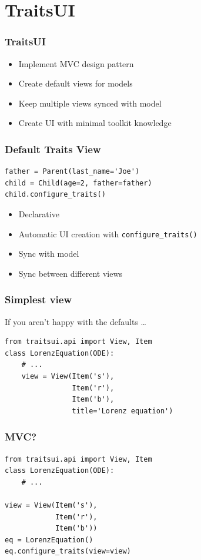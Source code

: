 \documentclass[14pt,compress]{beamer}
\newcommand{\typ}[1]{\lstinline{#1}}
\begin{document}
\section{TraitsUI}

\begin{frame}
  \frametitle{TraitsUI}
  \begin{itemize}
      \item Implement MVC design pattern
      \item Create default views for models
      \item Keep multiple views synced with model
      \item Create UI with minimal toolkit knowledge
  \end{itemize}
\end{frame}

\begin{frame}
\frametitle{Default Traits View}
\begin{lstlisting}
father = Parent(last_name='Joe')
child = Child(age=2, father=father)
child.configure_traits()
\end{lstlisting}
\pause
\begin{itemize}
    \item Declarative
\item Automatic UI creation with \typ{configure_traits()}
\item Sync with model
\item Sync between different views
\end{itemize}
\end{frame}

\begin{frame}
\frametitle{Simplest view}
If you aren't happy with the defaults \dots
\small
\begin{lstlisting}
from traitsui.api import View, Item
class LorenzEquation(ODE):
    # ...
    view = View(Item('s'),
                Item('r'),
                Item('b'), 
                title='Lorenz equation')
\end{lstlisting}
\end{frame}

\begin{frame}
\frametitle{MVC?}
\small
\begin{lstlisting}
from traitsui.api import View, Item
class LorenzEquation(ODE):
    # ...

view = View(Item('s'),
            Item('r'),
            Item('b'))
eq = LorenzEquation()
eq.configure_traits(view=view)
\end{lstlisting}
\end{frame}
\end{document}
